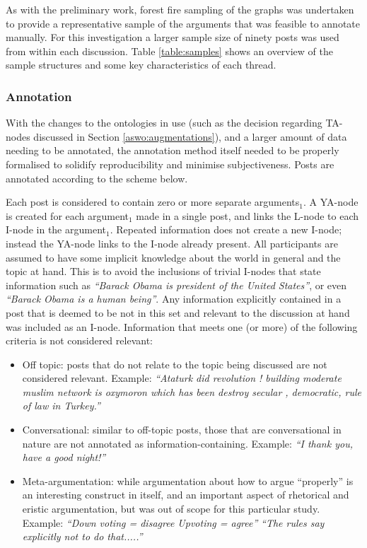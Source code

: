 As with the preliminary work, forest fire sampling of the graphs was undertaken to provide a representative sample of the arguments that was feasible to annotate manually. For this investigation a larger sample size of ninety posts was used from within each discussion. Table \ref{table:samples} shows an overview of the sample structures and some key characteristics of each thread.


\subsubsection{Annotation}
\label{aswo:investigation:annotations}
With the changes to the ontologies in use (such as the decision regarding TA-nodes discussed in Section \ref{aswo:augmentations}), and a larger amount of data needing to be annotated, the annotation method itself needed to be properly formalised to solidify reproducibility and minimise subjectiveness. Posts are annotated according to the scheme below.

Each post is considered to contain zero or more separate arguments$_1$. A YA-node is created for each argument$_1$ made in a single post, and links the L-node to each I-node in the argument$_1$. Repeated information does not create a new I-node; instead the YA-node links to the I-node already present. All participants are assumed to have some implicit knowledge about the world in general and the topic at hand. This is to avoid the inclusions of trivial I-nodes that state information such as \textit{``Barack Obama is president of the United States''}, or even \textit{``Barack Obama is a human being''}. Any information explicitly contained in a post that is deemed to be not in this set and relevant to the discussion at hand was included as an I-node. Information that meets one (or more) of the following criteria is not considered relevant:

\begin{itemize}
	\item Off topic: posts that do not relate to the topic being discussed are not considered relevant. Example: \textit{``Ataturk did revolution ! building moderate muslim network is oxymoron which has been destroy secular , democratic, rule of law in Turkey.''}
	\item Conversational: similar to off-topic posts, those that are conversational in nature are not annotated as information-containing. Example: \textit{``I thank you, have a good night!''}
	\item Meta-argumentation: while argumentation about how to argue ``properly'' is an interesting construct in itself, and an important aspect of rhetorical and eristic argumentation, but was out of scope for this particular study. Example: \textit{``Down voting = disagree Upvoting = agree''} \textit{``The rules say explicitly not to do that.....''}
\end{itemize}

